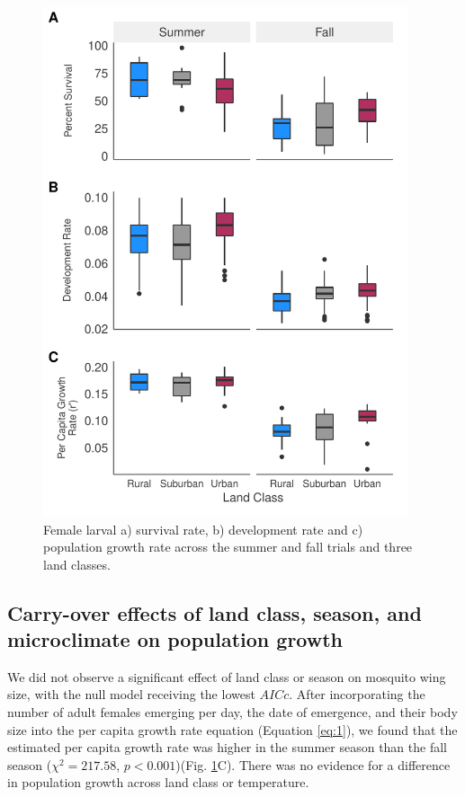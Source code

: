 \documentclass[12pt]{article}
\begin{document}
\begin{figure}
\centering\includegraphics[height=15cm, keepaspectratio]{survEmergeGrowth.pdf}
\caption{Female larval a) survival rate, b) development rate and c) population growth rate across the summer and fall trials and three land classes.}
\label{fig:growth}
\end{figure}

\subsection{Carry-over effects of land class, season, and microclimate on population growth}

We did not observe a significant effect of land class or season on mosquito wing size, with the null model receiving the lowest $AICc$. After incorporating the number of adult females emerging per day, the date of emergence, and their body size into the per capita growth rate equation (Equation \ref{eq:1}), we found that the estimated per capita growth rate was higher in the summer season than the fall season ($\chi^2=217.58$, $p<0.001$)(Fig. \ref{fig:growth}C). There was no evidence for a difference in population growth across land class or temperature.
\end{document}

